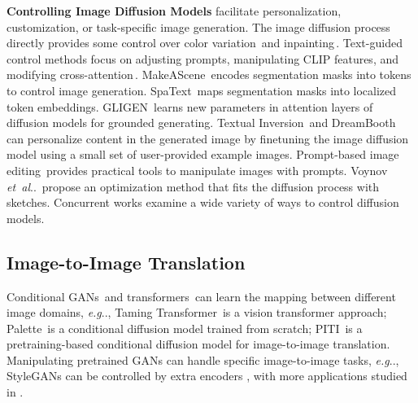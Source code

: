 \documentclass[10pt,twocolumn,letterpaper]{article}
\makeatletter
\DeclareRobustCommand\onedot{\futurelet\@let@token\@onedot}
\def\@onedot{\ifx\@let@token.\else.\null\fi\xspace}
\def\eg{\emph{e.g}\onedot}
\def\etal{\emph{et~al}\onedot}
\def\para#1{\vspace{0.25em}\noindent\textbf{#1}}
\makeatother
\begin{document}
	\para{Controlling Image Diffusion Models} facilitate personalization,
	customization, or task-specific image generation.  The image diffusion
	process directly provides some control over color
	variation\,\cite{meng2021sdedit} and
	inpainting\,\cite{ramesh2022hierarchical,avrahami2022blended}.
	Text-guided control methods focus on adjusting prompts, manipulating
	CLIP features, and modifying
	cross-attention\,\cite{avrahami2022blended, brooks2022instructpix2pix,
		gafni2022make,hertz2022prompt, kawar2022imagic,kim2022diffusionclip,
		nichol2021glide,parmar2023zero,ramesh2022hierarchical}.
	MakeAScene\,\cite{gafni2022make} encodes segmentation masks into
	tokens to control image generation.
	SpaText\,\cite{avrahami2022spatext} maps segmentation masks into
	localized token embeddings.  GLIGEN\,\cite{li2023gligen} learns new
	parameters in attention layers of diffusion models for grounded
	generating.  Textual Inversion\,\cite{gal2022image} and
	DreamBooth\,\cite{ruiz2022dreambooth} can personalize content in the
	generated image by finetuning the image diffusion model using a small
	set of user-provided example images.  Prompt-based image
	editing\,\cite{brooks2022instructpix2pix,huang2023region,pnpDiffusion2022}
	provides practical tools to manipulate images with prompts.
	Voynov\,\etal\,\cite{voynov2022sketch} propose an optimization method
	that fits the diffusion process with sketches.  Concurrent works
	\cite{bar2023multidiffusion,bashkirova2023masksketch,lhhuang2023composer,mou2023t2i}
	examine a wide variety of ways to control diffusion models.
	
	\subsection{Image-to-Image Translation}
	
	\noindent Conditional
	GANs\,\cite{choi2018stargan,isola2017image,park2019semantic,wang2018high,zhang2020cross,zhou2021cocosnet,CycleGAN2017,zhu2017toward} and transformers\,\cite{chen2021pre,esser2021taming, ramesh2021zero} can learn the mapping between different image domains, \eg, Taming
	Transformer\,\cite{esser2021taming} is a vision transformer
	approach; Palette\,\cite{saharia2022palette} is a conditional
	diffusion model trained from scratch; PITI\,\cite{wang2022pretraining} is a pretraining-based conditional
	diffusion model for image-to-image translation. Manipulating pretrained GANs can handle
	specific image-to-image tasks, \eg, StyleGANs can be
	controlled by extra encoders \cite{richardson2021encoding}, with more
	applications studied in
	\cite{alaluf2021matter,gal2022stylegan,karras2021style,katzir2022multi,mokady2022selfdistilled,nitzan2022mystyle,Patashnik_2021_ICCV,richardson2021encoding}.
	
\end{document}
